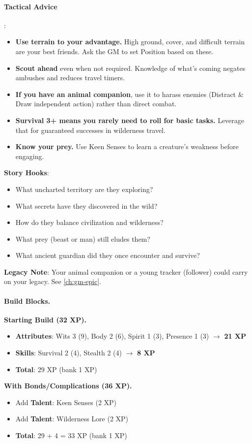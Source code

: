 \paragraph{Tactical Advice}:
\begin{itemize}
\item \textbf{Use terrain to your advantage.} High ground, cover, and difficult terrain are your best friends. Ask the GM to set Position based on these.
\item \textbf{Scout ahead} even when not required. Knowledge of what's coming negates ambushes and reduces travel timers.
\item \textbf{If you have an animal companion}, use it to harass enemies (Distract \& Draw independent action) rather than direct combat.
\item \textbf{Survival 3+ means you rarely need to roll for basic tasks.} Leverage that for guaranteed successes in wilderness travel.
\item \textbf{Know your prey.} Use Keen Senses to learn a creature's weakness before engaging.
\end{itemize}

\textbf{Story Hooks}:
\begin{itemize}
\item What uncharted territory are they exploring?
\item What secrets have they discovered in the wild?
\item How do they balance civilization and wilderness?
\item What prey (beast or man) still eludes them?
\item What ancient guardian did they once encounter and survive?
\end{itemize}

\textbf{Legacy Note}: Your animal companion or a young tracker (follower) could carry on your legacy. See \ref{ch:gm-epic}.

\paragraph{Build Blocks.}
\textbf{Starting Build (32 XP).}
\begin{itemize}
\item \textbf{Attributes}: Wits 3 (9), Body 2 (6), Spirit 1 (3), Presence 1 (3) \(\rightarrow\) \textbf{21 XP}
\item \textbf{Skills}: Survival 2 (4), Stealth 2 (4) \(\rightarrow\) \textbf{8 XP}
\item \textbf{Total}: 29 XP (bank 1 XP)
\end{itemize}
\textbf{With Bonds/Complications (36 XP).}
\begin{itemize}
\item Add \textbf{Talent}: Keen Senses (2 XP)
\item Add \textbf{Talent}: Wilderness Lore (2 XP)
\item \textbf{Total}: 29 + 4 = 33 XP (bank 1 XP)
\end{itemize}

